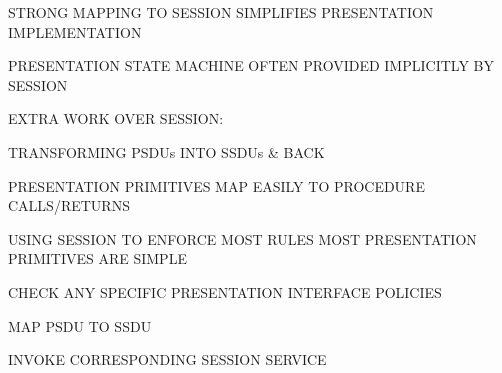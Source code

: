 %
%


%


\begin{bwslide}

\begin{nrtc}
\item	STRONG MAPPING TO SESSION SIMPLIFIES PRESENTATION IMPLEMENTATION
\item	PRESENTATION STATE MACHINE OFTEN PROVIDED IMPLICITLY BY SESSION
\item	EXTRA WORK OVER SESSION:
	\begin{nrtc}
	\item	TRANSFORMING PSDUs INTO SSDUs \& BACK
	\end{nrtc}
\end{nrtc}
\end{bwslide}


\begin{bwslide}

\begin{nrtc}
\item	PRESENTATION PRIMITIVES MAP EASILY TO PROCEDURE CALLS/RETURNS
\item	USING SESSION TO ENFORCE MOST RULES MOST PRESENTATION PRIMITIVES 
	ARE SIMPLE
	\begin{nrtc}
	\item	CHECK ANY SPECIFIC PRESENTATION INTERFACE POLICIES
	\item	MAP PSDU TO SSDU
	\item	INVOKE CORRESPONDING SESSION SERVICE
	\end{nrtc}
\end{nrtc}
\end{bwslide}



